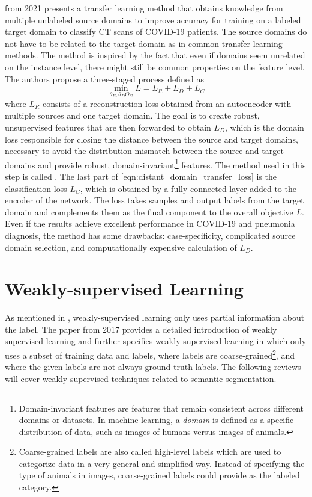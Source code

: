  \cite{9325521} from 2021 presents a transfer learning method that obtains knowledge from multiple unlabeled source domains to improve accuracy for training on a labeled target domain to classify CT scans of COVID-19 patients. The source domains do not have to be related to the target domain as in common transfer learning methods. The method is inspired by the fact that even if domains seem unrelated on the instance level, there might still be common properties on the feature level. The authors propose a three-staged process defined as
\begin{equation}
    \mathop{\min}_{\theta_E,\theta_D \Theta_C} L = L_R + L_D + L_C
    \label{eqn:distant_domain_transfer_loss}
\end{equation}
where $L_R$ consists of a reconstruction loss obtained from an autoencoder with multiple sources and one target domain. The goal is to create robust, unsupervised features that are then forwarded to obtain $L_D$, which is the domain loss responsible for closing the distance between the source and target domains, necessary to avoid the distribution mismatch between the source and target domains and provide robust, domain-invariant\footnote{Domain-invariant features are features that remain consistent across different domains or datasets. In machine learning, a \textit{domain} is defined as a specific distribution of data, such as images of humans versus images of animals.} features. The method used in this step is called  \cite{turchenko2017deep}. The last part of \ref{eqn:distant_domain_transfer_loss} is the classification loss $L_C$, which is obtained by a fully connected layer added to the encoder of the network. The loss takes samples and output labels from the target domain and complements them as the final component to the overall objective $L$. Even if the results achieve excellent performance in COVID-19 and pneumonia diagnosis, the method has some drawbacks: case-specificity, complicated source domain selection, and computationally expensive calculation of $L_D$.

\section{Weakly-supervised Learning}
As mentioned in , weakly-supervised learning only uses partial information about the label. The paper  \cite{10.1093/nsr/nwx106} from 2017 provides a detailed introduction of weakly supervised learning and further specifies weakly supervised learning in  which only uses a subset of training data and labels,  where labels are coarse-grained\footnote{Coarse-grained labels are also called high-level labels which are used to categorize data in a very general and simplified way. Instead of specifying the type of animals in images, coarse-grained labels could provide  as the labeled category.}, and  where the given labels are not always ground-truth labels. The following reviews will cover weakly-supervised techniques related to semantic segmentation.

